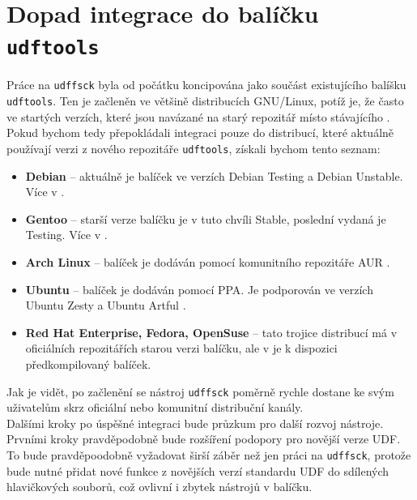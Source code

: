 \section{Dopad integrace do balíčku \texttt{udftools}}
\label{sec:dopad}
Práce na \texttt{udffsck} byla od počátku koncipována jako součást existujícího balíšku \texttt{udftools}. Ten je začleněn ve většině distribucích GNU/Linux, potíž je, že často ve startých verzích, které jsou navázané na starý repozitář \cite{udftools-sourceforge} místo stávajícího \cite{udftools-github}.\\
Pokud bychom tedy přepokládali integraci pouze do distribucí, které aktuálně používají verzi z nového repozitáře \texttt{udftools}, získali bychom tento seznam:
\begin{itemize}
    \item\textbf{Debian} -- aktuálně je balíček ve verzích Debian Testing a Debian Unstable. Více v \cite{udftools-debian}.
    \item\textbf{Gentoo} -- starší verze balíčku je v tuto chvíli Stable, poslední vydaná je Testing. Více v \cite{udftools-gentoo}.
    \item\textbf{Arch Linux} -- balíček je dodáván pomocí komunitního repozitáře AUR \cite{udftools-arch}.
    \item\textbf{Ubuntu} -- balíček je dodáván pomocí PPA. Je podporován ve verzích Ubuntu Zesty a Ubuntu Artful \cite{udftools-ubuntu}.
    \item\textbf{Red Hat Enterprise, Fedora, OpenSuse} -- tato trojice distribucí má v oficiálních repozitářích starou verzi balíčku, ale v \cite{udftools-rhel} je k dispozici předkompilovaný balíček.
\end{itemize}
Jak je vidět, po začlenění se nástroj \texttt{udffsck} poměrně rychle dostane ke svým uživatelům skrz oficiální nebo komunitní distribuční kanály.\\
Dalšími kroky po úspěšné integraci bude průzkum pro další rozvoj nástroje. Prvními kroky pravděpodobně bude rozšíření podopory pro novější verze UDF. To bude pravděpoodobně vyžadovat širší záběr než jen práci na \texttt{udffsck}, protože bude nutné přidat nové funkce z novějších verzí standardu UDF do sdílených hlavičkových souborů, což ovlivní i zbytek nástrojů v balíčku.
